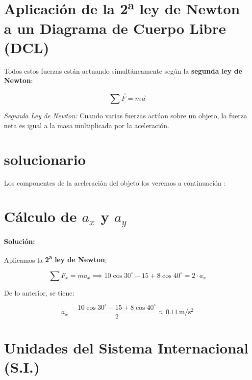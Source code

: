 \section*{Aplicación de la 2\textsuperscript{a} ley de Newton a un Diagrama de Cuerpo Libre (DCL)}

Todos estos fuerzas están actuando simultáneamente según la \textbf{segunda ley de Newton}:

\[
\sum \vec{F} = m\vec{a}
\]

\begin{center}
\end{center}
\vspace{0.5cm}
\textit{Segunda Ley de Newton:} Cuando varias fuerzas actúan sobre un objeto, la fuerza neta es igual a la masa multiplicada por la aceleración.

\section{solucionario}
Los componentes de la aceleración del objeto los veremos a continuación : 

\section*{Cálculo de $a_x$ y $a_y$}

\textbf{Solución:}

Aplicamos la \textbf{2\textsuperscript{a} ley de Newton}:

\[
\sum F_x = ma_x \implies 10 \cos 30^\circ - 15 + 8 \cos 40^\circ = 2 \cdot a_x
\]

De lo anterior, se tiene:

\[
a_x = \frac{10 \cos 30^\circ - 15 + 8 \cos 40^\circ}{2} \approx 0.11 \, \mathrm{m/s^2}
\]


\section{Unidades del Sistema Internacional (S.I.)}

